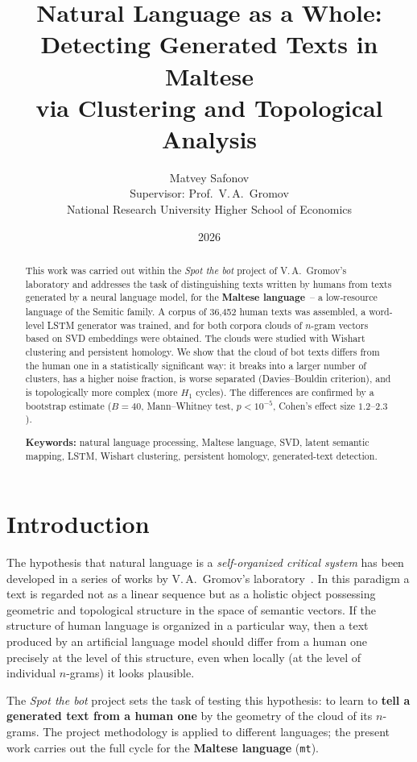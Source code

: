 \documentclass[12pt,a4paper]{article}
\title{\vspace{-1cm}\Large\bfseries
Natural Language as a Whole:\\
Detecting Generated Texts in Maltese\\
via Clustering and Topological Analysis}
\author{Matvey Safonov\\[2pt]
\small Supervisor: Prof.\ V.\,A.~Gromov\\
\small National Research University Higher School of Economics}
\date{2026}
\begin{document}
\maketitle

\begin{abstract}
\noindent
This work was carried out within the \emph{Spot the bot} project of
V.\,A.~Gromov's laboratory and addresses the task of distinguishing texts
written by humans from texts generated by a neural language model, for the
\textbf{Maltese language}~-- a low-resource language of the Semitic family. A
corpus of 36{,}452 human texts was assembled, a word-level LSTM generator was
trained, and for both corpora clouds of $n$-gram vectors based on SVD
embeddings were obtained. The clouds were studied with Wishart clustering and
persistent homology. We show that the cloud of bot texts differs from the human
one in a statistically significant way: it breaks into a larger number of
clusters, has a higher noise fraction, is worse separated (Davies--Bouldin
criterion), and is topologically more complex (more $H_1$ cycles). The
differences are confirmed by a bootstrap estimate ($B=40$, Mann--Whitney test,
$p<10^{-5}$, Cohen's effect size $1.2$--$2.3$).

\medskip
\noindent\textbf{Keywords:} natural language processing, Maltese language,
SVD, latent semantic mapping, LSTM, Wishart clustering, persistent homology,
generated-text detection.
\end{abstract}

\tableofcontents
\newpage

\section{Introduction}

The hypothesis that natural language is a \emph{self-organized critical system}
has been developed in a series of works by V.\,A.~Gromov's
laboratory~\cite{gromov2020,gromov2023}. In this paradigm a text is regarded not
as a linear sequence but as a holistic object possessing geometric and
topological structure in the space of semantic vectors. If the structure of
human language is organized in a particular way, then a text produced by an
artificial language model should differ from a human one precisely at the level
of this structure, even when locally (at the level of individual $n$-grams) it
looks plausible.

The \emph{Spot the bot} project sets the task of testing this hypothesis: to
learn to \textbf{tell a generated text from a human one} by the geometry of the
cloud of its $n$-grams. The project methodology is applied to different
languages; the present work carries out the full cycle for the
\textbf{Maltese language} (\texttt{mt}).
\end{document}
